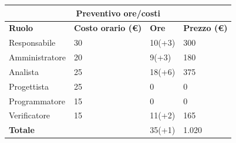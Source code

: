 \documentclass[a4paper, 12pt]{article}
\begin{document}
\begin{center}
	\begin{tabularx}{\textwidth}{|X|X|X|X|}
		\hline
		\multicolumn{4}{|c|}{\textbf{Preventivo ore/costi}}                                      \\
		\hline
		\hline
		\textbf{Ruolo}  & \textbf{Costo orario (\euro)} & \textbf{Ore} & \textbf{Prezzo (\euro)} \\
		\hline
		Responsabile    & 30                            & 10(+3)            & 300                      \\
		\hline
		Amministratore  & 20                            & 9(+3)            & 180                      \\
		\hline
		Analista        & 25                            & 18(+6)           & 375                     \\
		\hline
		Progettista     & 25                            & 0            & 0                       \\
		\hline
		Programmatore   & 15                            & 0            & 0                       \\
		\hline
		Verificatore    & 15                            & 11(+2)            & 165                      \\
		\hline
		\hline
		\textbf{Totale} &                               & 35(+1)           &   1.020                      \\ 		\hline
	\end{tabularx}\\[8pt]
	\mbox{}\\
\end{center}
\end{document}
